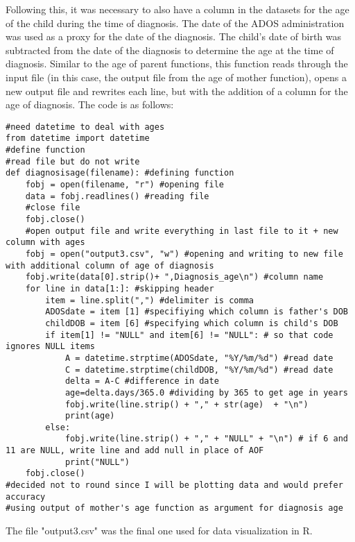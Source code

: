 \documentclass{article}
\begin{document}
Following this, it was necessary to also have a column in the datasets for the age of the child during the time of diagnosis. The date of the ADOS administration was used as a proxy for the date of the diagnosis. The child's date of birth was subtracted from the date of the diagnosis to determine the age at the time of diagnosis. Similar to the age of parent functions, this function reads through the input file (in this case, the output file from the age of mother function), opens a new output file and rewrites each line, but with the addition of a column for the age of diagnosis. The code is as follows: 
\begin{verbatim}
#need datetime to deal with ages
from datetime import datetime
#define function
#read file but do not write
def diagnosisage(filename): #defining function
    fobj = open(filename, "r") #opening file
    data = fobj.readlines() #reading file
    #close file
    fobj.close()
    #open output file and write everything in last file to it + new column with ages
    fobj = open("output3.csv", "w") #opening and writing to new file with additional column of age of diagnosis
    fobj.write(data[0].strip()+ ",Diagnosis_age\n") #column name
    for line in data[1:]: #skipping header
        item = line.split(",") #delimiter is comma
        ADOSdate = item [1] #specifiying which column is father's DOB
        childDOB = item [6] #specifying which column is child's DOB
        if item[1] != "NULL" and item[6] != "NULL": # so that code ignores NULL items
            A = datetime.strptime(ADOSdate, "%Y/%m/%d") #read date
            C = datetime.strptime(childDOB, "%Y/%m/%d") #read date
            delta = A-C #difference in date
            age=delta.days/365.0 #dividing by 365 to get age in years
            fobj.write(line.strip() + "," + str(age)  + "\n")
            print(age)
        else:
            fobj.write(line.strip() + "," + "NULL" + "\n") # if 6 and 11 are NULL, write line and add null in place of AOF
            print("NULL")
    fobj.close()
#decided not to round since I will be plotting data and would prefer accuracy
#using output of mother's age function as argument for diagnosis age
\end{verbatim}

The file "output3.csv" was the final one used for data visualization in R. 
\end{document}
